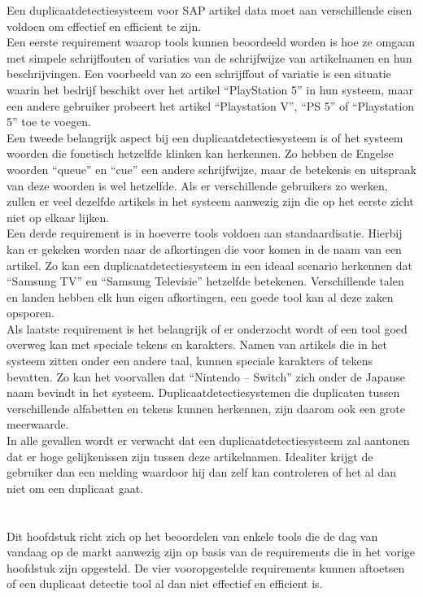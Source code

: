Een duplicaatdetectiesysteem voor SAP artikel data moet aan verschillende eisen voldoen om effectief en efficient te zijn.
\\Een eerste requirement waarop tools kunnen beoordeeld worden is hoe ze omgaan met simpele schrijffouten of variaties van de schrijfwijze van artikelnamen en hun beschrijvingen. Een voorbeeld van zo een schrijffout of variatie is een situatie waarin het bedrijf beschikt over het artikel “PlayStation 5” in hun systeem, maar een andere gebruiker probeert het artikel “Playstation V”, “PS 5” of “Playstation 5”  toe te voegen.
\\Een tweede belangrijk aspect bij een duplicaatdetectiesysteem is of het systeem woorden die fonetisch hetzelfde klinken kan herkennen. Zo hebben de Engelse woorden “queue” en “cue” een andere schrijfwijze, maar de betekenis en uitspraak van deze woorden is wel hetzelfde. Als er verschillende gebruikers zo werken, zullen er veel dezelfde artikels in het systeem aanwezig zijn die op het eerste zicht niet op elkaar lijken.
\\Een derde requirement is in hoeverre tools voldoen aan standaardisatie. Hierbij kan er gekeken worden naar de afkortingen die voor komen in de naam van een artikel. Zo kan een duplicaatdetectiesysteem in een ideaal scenario herkennen dat “Samsung TV” en “Samsung Televisie” hetzelfde betekenen. Verschillende talen en landen hebben elk hun eigen afkortingen, een goede tool kan al deze zaken opsporen.
\\Als laatste requirement is het belangrijk of er onderzocht wordt of een tool goed overweg kan met speciale tekens en karakters. Namen van artikels die in het systeem zitten onder een andere taal, kunnen speciale karakters of tekens bevatten. Zo kan het voorvallen dat “Nintendo – Switch” zich onder de Japanse naam bevindt in het systeem. Duplicaatdetectiesystemen die duplicaten tussen verschillende alfabetten en tekens kunnen herkennen, zijn daarom ook een grote meerwaarde. 
\\In alle gevallen wordt er verwacht dat een duplicaatdetectiesysteem zal aantonen dat er hoge gelijkenissen zijn tussen deze artikelnamen. Idealiter krijgt de gebruiker dan een melding waardoor hij dan zelf kan controleren of het al dan niet om een duplicaat gaat.

\section{}%
\label{sec:tools}
Dit hoofdstuk richt zich op het beoordelen van enkele tools die de dag van vandaag op de markt aanwezig zijn op basis van de requirements die in het vorige hoofdstuk zijn opgesteld. De vier vooropgestelde requirements kunnen aftoetsen of een duplicaat detectie tool al dan niet effectief en efficient is.

